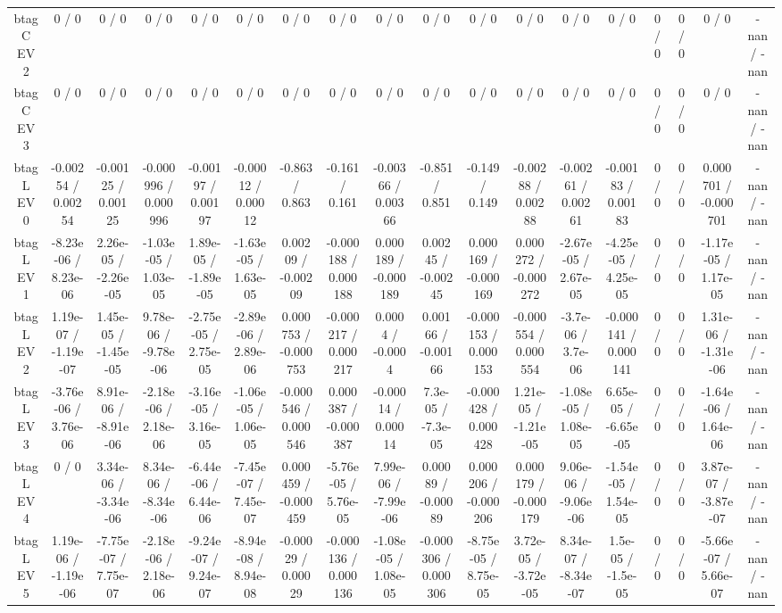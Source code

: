 \documentclass[10pt]{article}
\begin{document}
\begin{table}[htbp]
\begin{center}
\begin{tabular}{|c|c|c|c|c|c|c|c|c|c|c|c|c|c|c|c|c|c|}
  btag C EV 2 & 0 / 0 & 0 / 0 & 0 / 0 & 0 / 0 & 0 / 0 & 0 / 0 & 0 / 0 & 0 / 0 & 0 / 0 & 0 / 0 & 0 / 0 & 0 / 0 & 0 / 0 & 0 / 0 & 0 / 0 & 0 / 0 & -nan / -nan \\ 
  btag C EV 3 & 0 / 0 & 0 / 0 & 0 / 0 & 0 / 0 & 0 / 0 & 0 / 0 & 0 / 0 & 0 / 0 & 0 / 0 & 0 / 0 & 0 / 0 & 0 / 0 & 0 / 0 & 0 / 0 & 0 / 0 & 0 / 0 & -nan / -nan \\ 
  btag L EV 0 & -0.00254 / 0.00254 & -0.00125 / 0.00125 & -0.000996 / 0.000996 & -0.00197 / 0.00197 & -0.00012 / 0.00012 & -0.863 / 0.863 & -0.161 / 0.161 & -0.00366 / 0.00366 & -0.851 / 0.851 & -0.149 / 0.149 & -0.00288 / 0.00288 & -0.00261 / 0.00261 & -0.00183 / 0.00183 & 0 / 0 & 0 / 0 & 0.000701 / -0.000701 & -nan / -nan \\ 
  btag L EV 1 & -8.23e-06 / 8.23e-06 & 2.26e-05 / -2.26e-05 & -1.03e-05 / 1.03e-05 & 1.89e-05 / -1.89e-05 & -1.63e-05 / 1.63e-05 & 0.00209 / -0.00209 & -0.000188 / 0.000188 & 0.000189 / -0.000189 & 0.00245 / -0.00245 & 0.000169 / -0.000169 & 0.000272 / -0.000272 & -2.67e-05 / 2.67e-05 & -4.25e-05 / 4.25e-05 & 0 / 0 & 0 / 0 & -1.17e-05 / 1.17e-05 & -nan / -nan \\ 
  btag L EV 2 & 1.19e-07 / -1.19e-07 & 1.45e-05 / -1.45e-05 & 9.78e-06 / -9.78e-06 & -2.75e-05 / 2.75e-05 & -2.89e-06 / 2.89e-06 & 0.000753 / -0.000753 & -0.000217 / 0.000217 & 0.0004 / -0.0004 & 0.00166 / -0.00166 & -0.000153 / 0.000153 & -0.000554 / 0.000554 & -3.7e-06 / 3.7e-06 & -0.000141 / 0.000141 & 0 / 0 & 0 / 0 & 1.31e-06 / -1.31e-06 & -nan / -nan \\ 
  btag L EV 3 & -3.76e-06 / 3.76e-06 & 8.91e-06 / -8.91e-06 & -2.18e-06 / 2.18e-06 & -3.16e-05 / 3.16e-05 & -1.06e-05 / 1.06e-05 & -0.000546 / 0.000546 & 0.000387 / -0.000387 & -0.00014 / 0.00014 & 7.3e-05 / -7.3e-05 & -0.000428 / 0.000428 & 1.21e-05 / -1.21e-05 & -1.08e-05 / 1.08e-05 & 6.65e-05 / -6.65e-05 & 0 / 0 & 0 / 0 & -1.64e-06 / 1.64e-06 & -nan / -nan \\ 
  btag L EV 4 & 0 / 0 & 3.34e-06 / -3.34e-06 & 8.34e-06 / -8.34e-06 & -6.44e-06 / 6.44e-06 & -7.45e-07 / 7.45e-07 & 0.000459 / -0.000459 & -5.76e-05 / 5.76e-05 & 7.99e-06 / -7.99e-06 & 0.00089 / -0.00089 & 0.000206 / -0.000206 & 0.000179 / -0.000179 & 9.06e-06 / -9.06e-06 & -1.54e-05 / 1.54e-05 & 0 / 0 & 0 / 0 & 3.87e-07 / -3.87e-07 & -nan / -nan \\ 
  btag L EV 5 & 1.19e-06 / -1.19e-06 & -7.75e-07 / 7.75e-07 & -2.18e-06 / 2.18e-06 & -9.24e-07 / 9.24e-07 & -8.94e-08 / 8.94e-08 & -0.00029 / 0.00029 & -0.000136 / 0.000136 & -1.08e-05 / 1.08e-05 & -0.000306 / 0.000306 & -8.75e-05 / 8.75e-05 & 3.72e-05 / -3.72e-05 & 8.34e-07 / -8.34e-07 & 1.5e-05 / -1.5e-05 & 0 / 0 & 0 / 0 & -5.66e-07 / 5.66e-07 & -nan / -nan \\ 

\end{tabular}
\end{center}
\end{table}
\end{document}
